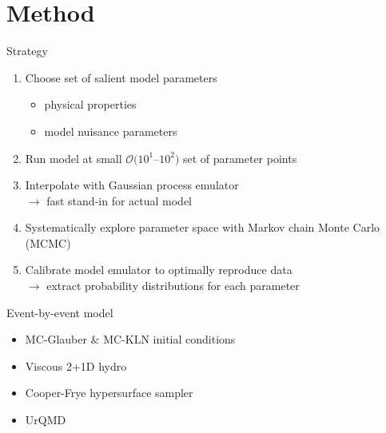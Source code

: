 \documentclass{beamer}
\begin{document}
\section{Method}

\begin{frame}{Strategy}
  \begin{enumerate}
    \item Choose set of salient model parameters
      \begin{itemize}
        \item physical properties
        \item model nuisance parameters
      \end{itemize}
    \item Run model at small $\mathcal O(10^1$--$10^2)$ set of parameter points
    \item Interpolate with Gaussian process emulator \\
      $\rightarrow$ fast stand-in for actual model
    \item Systematically explore parameter space with Markov chain Monte Carlo (MCMC)
    \item Calibrate model emulator to optimally reproduce data \\
      $\rightarrow$ extract probability distributions for each parameter
  \end{enumerate}
\end{frame}


\begin{frame}{Event-by-event model}
    \begin{itemize}
      \item MC-Glauber \& MC-KLN initial conditions \\
        \smallskip
      \item Viscous 2+1D hydro \\
        \smallskip
      \item Cooper-Frye hypersurface sampler \\
        \smallskip
      \item UrQMD \\
         \\[-1ex]
    \end{itemize}
\end{frame}
\end{document}
